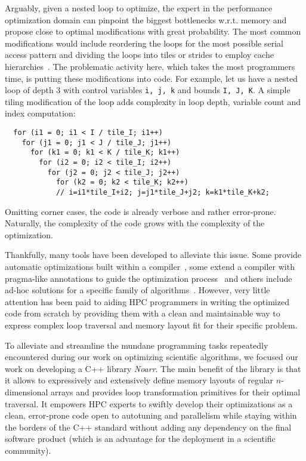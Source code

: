 Arguably, given a nested loop to optimize, the expert in the performance optimization domain can pinpoint the biggest bottlenecks w.r.t. memory and propose close to optimal modifications with great probability. The most common modifications would include reordering the loops for the most possible serial access pattern and dividing the loops into tiles or strides to employ cache hierarchies~\cite{wolf1991data}. The problematic activity here, which takes the most programmers time, is putting these modifications into code. For example, let us have a nested loop of depth 3 with control variables \texttt{i, j, k} and bounds \texttt{I, J, K}. A simple tiling modification of the loop adds complexity in loop depth, variable count and index computation: 
\begin{verbatim}
  for (i1 = 0; i1 < I / tile_I; i1++)
    for (j1 = 0; j1 < J / tile_J; j1++)
      for (k1 = 0; k1 < K / tile_K; k1++)
        for (i2 = 0; i2 < tile_I; i2++)
          for (j2 = 0; j2 < tile_J; j2++)
            for (k2 = 0; k2 < tile_K; k2++)
            // i=i1*tile_I+i2; j=j1*tile_J+j2; k=k1*tile_K+k2;
\end{verbatim}
Omitting corner cases, the code is already verbose and rather error-prone. Naturally, the complexity of the code grows with the complexity of the optimization.

Thankfully, many tools have been developed to alleviate this issue. Some provide automatic optimizations built within a compiler~\cite{trifunovic2010graphite,grosser2012polly}, some extend a compiler with pragma-like annotations to guide the optimization process~\cite{donadio2005language,yi2007poet,chen2008chill,namjoshi2016loopy} and others include ad-hoc solutions for a specific family of algorithms~\cite{9485033,AFANASYEV2021100707}. However, very little attention has been paid to aiding HPC programmers in writing the optimized code from scratch by providing them with a clean and maintainable way to express complex loop traversal and memory layout fit for their specific problem.

To alleviate and streamline the mundane programming tasks repeatedly encountered during our work on optimizing scientific algorithms, we focused our work on developing a C++ library \emph{Noarr}. The main benefit of the library is that it allows to expressively and extensively define memory layouts of regular $n$-dimensional arrays and provides loop transformation primitives for their optimal traversal. It empowers HPC experts to swiftly develop their optimizations as a clean, error-prone code open to autotuning and parallelism while staying within the borders of the C++ standard without adding any dependency on the final software product (which is an advantage for the deployment in a scientific community).

